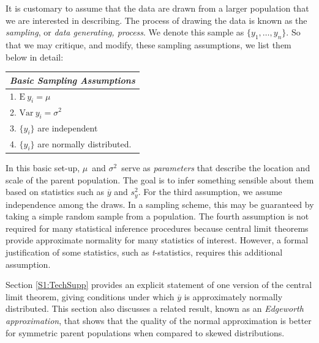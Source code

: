 

It is customary to assume that the data are drawn from a larger
population that we are interested in describing. The process of
drawing the data is known as the \emph{sampling}, or \emph{data
generating, process}. We denote this sample as $\{y_1,\ldots,y_n\}$.
So that we may critique, and modify, these sampling assumptions, we
list them below in detail:\smallskip

\begin{center}
\begin{tabular}{l}
\hline \textit{Basic Sampling Assumptions} \\ \hline
1. $\mathrm{E~}y_i=\mu $ \\
2. $\mathrm{Var~}y_i=\sigma ^{2}$ \\
3. $\{y_i\}$ are independent \\
4. $\{y_i\}$ are normally distributed. \\ \hline
\end{tabular}
\end{center}


In this basic set-up, $\mu $\ and $\sigma ^{2}$\ serve as
\emph{parameters} that describe the location and scale of the parent
population. The goal is to infer something sensible about them based
on statistics such as $\overline{y}$ and $s_y^{2}$. For the third
assumption, we assume independence among the draws. In a sampling
scheme, this may be guaranteed by taking a simple random sample from
a population. The fourth assumption is not required for many
statistical inference procedures because central limit theorems
provide approximate normality for many statistics of interest.
However, a formal justification of some statistics, such as
\textit{t}-statistics, requires this additional
assumption.

Section \ref{S1:TechSupp} provides an explicit statement of one
version of the central limit theorem, giving conditions under which
$\overline{y}$ is approximately normally distributed. This section
also discusses a related result, known as an \emph{Edgeworth
approximation}, that shows that the quality of the normal
approximation is better for symmetric parent populations when
compared to skewed distributions.

